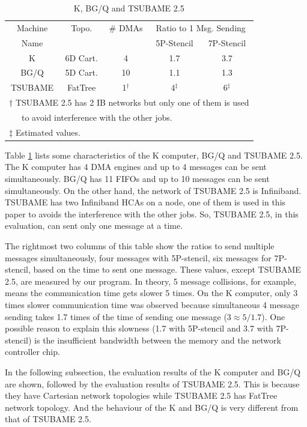 \documentclass[Afour,times,sagev]{sagej}
\begin{document}
\begin{table}[htb]
\centering
\caption{K, BG/Q and TSUBAME 2.5}
\label{tbl:machines}
{\small
\begin{tabular}{c|c|c|c|c}
\hline
Machine & Topo. & \# DMAs &\multicolumn{2}{c}{Ratio to 1 Msg. Sending}\\
Name & &  & 5P-Stencil & 7P-Stencil \\
\hline
K & 6D Cart. & 4 & 1.7 & 3.7 \\
BG/Q\cite{Chen:2011:IBG:2063384.2063419} & 5D Cart. & 10 & 1.1 & 1.3 \\
TSUBAME & FatTree & 1$^{\dagger}$ & 4$^{\ddagger}$ & 6$^{\ddagger}$ \\
\hline
\multicolumn{5}{l}{\footnotesize $\dagger$ TSUBAME 2.5 has 2 IB
  networks but only one of them is used} \\
\multicolumn{5}{l}{\footnotesize ~~~to avoid
  interference with the other jobs.} \\
\multicolumn{5}{l}{\footnotesize $\ddagger$ Estimated values.} \\
\end{tabular}
}
\end{table}

Table \ref{tbl:machines} lists some characteristics of the K computer,
BG/Q and TSUBAME 2.5. The K computer has 4 DMA engines and up to 4
messages can be sent simultaneously. BG/Q has 11 FIFOs and up to 10
messages can be sent simultaneously. On the other hand, the network of
TSUBAME 2.5 is Infiniband\cite{infiniband}. TSUBAME has two
Infiniband HCAs on a node, one of them is used in this paper to avoids
the interference with the other jobs. So, TSUBAME 2.5, in this
evaluation, can sent only one message at a time. 

The rightmost two columns of this table show the ratios to send
multiple messages simultaneously, four messages with 5P-stencil, six
messages for 7P-stencil, based on the time to sent one message. These
values, except TSUBAME 2.5, are measured by our program. In
theory, 5 message collisions, for example, means the communication
time gets slower 5 times. On the K computer, only 3 times
slower communication time was observed because simultaneous 4 message
sending takes 1.7 times of the time of sending one message ($3 \approx
5/1.7$)\cite{Hori-EuroMPI2015}. One possible reason to explain this
slowness (1.7 with 5P-stencil and 3.7 with 7P-stencil) is the
insufficient bandwidth between the memory and the network controller
chip. 

In the following subsection, the evaluation results of the K computer
and BG/Q are shown, followed by the evaluation results of TSUBAME
2.5. This is because they have Cartesian network topologies 
while TSUBAME 2.5 has FatTree network topology. And the behaviour of
the K and BG/Q is very different from that of TSUBAME 2.5.
\end{document}
